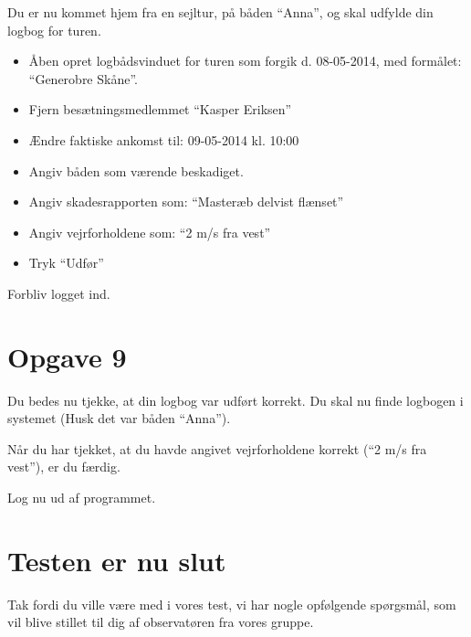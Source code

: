 Du er nu kommet hjem fra en sejltur, på båden ``Anna'', og skal udfylde din logbog for turen.

\begin{itemize}
	\item Åben opret logbådsvinduet for turen som forgik d. 08-05-2014, med formålet: ``Generobre Skåne''.
	\item Fjern besætningsmedlemmet ``Kasper Eriksen''
	\item Ændre faktiske ankomst til: 09-05-2014 kl. 10:00
	\item Angiv båden som værende beskadiget.
	\item Angiv skadesrapporten som: ``Masteræb delvist flænset''
	\item Angiv vejrforholdene som: ``2 m/s fra vest''
	\item Tryk ``Udfør''
\end{itemize}

Forbliv logget ind.

\section{Opgave 9}

Du bedes nu tjekke, at din logbog var udført korrekt.
Du skal nu finde logbogen i systemet (Husk det var båden ``Anna'').

Når du har tjekket, at du havde angivet vejrforholdene korrekt (``2 m/s fra vest''), er du færdig.

Log nu ud af programmet.

\section{Testen er nu slut}

Tak fordi du ville være med i vores test, vi har nogle opfølgende spørgsmål, som vil blive stillet til dig af observatøren fra vores gruppe.

